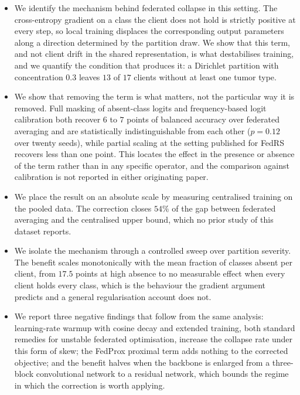 \documentclass[journal]{IEEEtran}
\begin{document}
\begin{itemize}
\item We identify the mechanism behind federated collapse in this setting. The
cross-entropy gradient on a class the client does not hold is strictly positive
at every step, so local training displaces the corresponding output parameters
along a direction determined by the partition draw. We show that this term, and
not client drift in the shared representation, is what destabilises training,
and we quantify the condition that produces it: a Dirichlet partition with
concentration $0.3$ leaves $13$ of $17$ clients without at least one tumor type.

\item We show that removing the term is what matters, not the particular way it
is removed. Full masking of absent-class logits and frequency-based logit
calibration both recover $6$ to $7$ points of balanced accuracy over federated
averaging and are statistically indistinguishable from each other
($p=0.12$ over twenty seeds), while partial scaling at the setting published for
FedRS recovers less than one point. This locates the effect in the presence or
absence of the term rather than in any specific operator, and the comparison
against calibration is not reported in either originating paper.

\item We place the result on an absolute scale by measuring centralised
training on the pooled data. The correction closes $54\%$ of the gap between
federated averaging and the centralised upper bound, which no prior study of
this dataset reports.

\item We isolate the mechanism through a controlled sweep over partition
severity. The benefit scales monotonically with the mean fraction of classes
absent per client, from $17.5$ points at high absence to no measurable effect
when every client holds every class, which is the behaviour the gradient
argument predicts and a general regularisation account does not.

\item We report three negative findings that follow from the same analysis:
learning-rate warmup with cosine decay and extended training, both standard
remedies for unstable federated optimisation, increase the collapse rate under
this form of skew; the FedProx proximal term adds nothing to the corrected
objective; and the benefit halves when the backbone is enlarged from a three-block
convolutional network to a residual network, which bounds the regime in which
the correction is worth applying.
\end{itemize}
\end{document}
